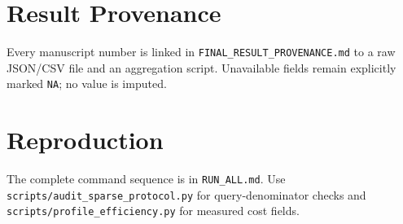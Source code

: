 \documentclass[conference]{IEEEtran}
\begin{document}
\section{Result Provenance}
Every manuscript number is linked in \texttt{FINAL\_RESULT\_PROVENANCE.md} to
a raw JSON/CSV file and an aggregation script. Unavailable fields remain
explicitly marked \texttt{NA}; no value is imputed.

\section{Reproduction}
The complete command sequence is in \texttt{RUN\_ALL.md}.  Use
\texttt{scripts/audit\_sparse\_protocol.py} for query-denominator checks and
\texttt{scripts/profile\_efficiency.py} for measured cost fields.
\end{document}
